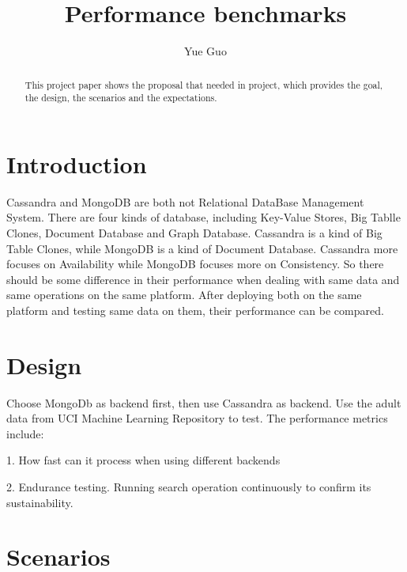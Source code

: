 
\title{Performance benchmarks}

\author{Yue Guo}

\begin{abstract}
This project paper shows the proposal that needed in project, which 
provides the goal, the design, the scenarios and the expectations.
\end{abstract}



\maketitle


\section{Introduction}
Cassandra and MongoDB are both not Relational DataBase Management System. 
There are four kinds of database, including Key-Value Stores, Big Tablle 
Clones, Document Database and Graph Database. Cassandra is a kind of Big 
Table Clones, while MongoDB is a kind of Document Database. Cassandra more 
focuses on Availability while MongoDB focuses more on Consistency. So there
 should be some difference in their performance when dealing with same data 
 and same operations on the same platform. After deploying both on the same 
 platform and testing same data on them, their performance can be compared.


\section{Design}
Choose MongoDb as backend first, then use Cassandra as backend. Use the adult
 data from UCI Machine Learning Repository to test. The performance metrics include: 

1. How fast can it process when using different backends

2. Endurance testing. Running search operation continuously to confirm its 
sustainability.

\section{Scenarios}

